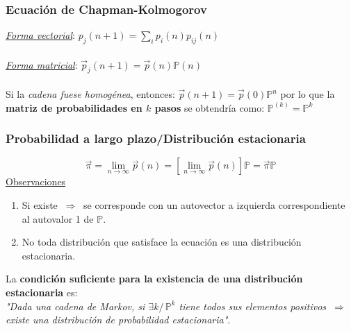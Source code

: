 \documentclass{article}
\newcommand{\tq}{/\,}                                   %
\newcommand{\Rightarrows}{\: \Rightarrow \:}            %
\newcommand{\sumatoria}[2]{\sum_{#1} ^{#2}}
\begin{document}
\subsubsection{Ecuación de Chapman-Kolmogorov}
\underline{\emph{Forma vectorial}}: $p_j(n+1) = \sumatoria{i}{} p_i(n) p_{ij}(n)$
\\\\\underline{\emph{Forma matricial}}: $\Vec{p}_j(n+1) = \Vec{p}(n) \mathbb{P}(n)$
\\\\ Si la \emph{cadena fuese homogénea}, entonces:  $\Vec{p}(n+1) = \Vec{p}(0) \mathbb{P}^n$ 
por lo que la \textbf{matriz de probabilidades en $k$ pasos} se obtendría como: $\mathbb{P}^{(k)} = \mathbb{P}^k$

\subsubsection{Probabilidad a largo plazo/Distribución estacionaria}
\begin{equation*}
    \Vec{\pi} = \lim_{n \rightarrow \infty} \Vec{p}(n) = \left[\lim_{n \rightarrow \infty}\Vec{p}(n)\right] \mathbb{P} = \Vec{\pi} \mathbb{P}
\end{equation*}
\underline{Observaciones}
\begin{enumerate}
    \item Si existe $\Rightarrows$ se corresponde con un autovector a izquierda correspondiente al autovalor 1 de $\mathbb{P}$.
    \item No toda distribución que satisface la ecuación es una distribución estacionaria.
\end{enumerate}
La \textbf{condición suficiente para la existencia de una distribución estacionaria} es:
\\\emph{"Dada una cadena de Markov, si $\exists k \tq \mathbb{P}^k$ tiene todos sus elementos positivos $\Rightarrows$ existe una distribución de probabilidad estacionaria"}.
\end{document}
